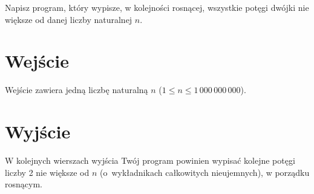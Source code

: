 \documentclass{spiral-kurs}
\begin{document}
\makeheader
%
    Napisz program, który wypisze, w kolejności rosnącej, wszystkie
    potęgi dwójki nie większe od danej liczby naturalnej $n$.

    \section{Wejście}
    Wejście zawiera jedną liczbę naturalną $n$
    ($1 \le n \le 1\,000\,000\,000$).
      
    \section{Wyjście}
    W kolejnych wierszach wyjścia Twój program powinien wypisać kolejne
    potęgi liczby 2 nie większe od $n$ (o~wykładnikach całkowitych nieujemnych),
    w porządku rosnącym.



  
\end{document}
